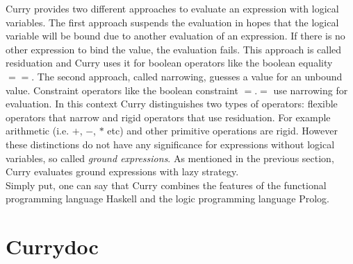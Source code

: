 \documentclass[%
	pdftex,%
	a4paper,%
	oneside,%
	chapterprefix,%
	headsepline,%
	12pt%
]{scrbook}
\begin{document}

Curry provides two different approaches to evaluate an expression with
logical variables. %
The first approach suspends the evaluation in hopes that the logical
variable will be bound due to another evaluation of an expression. %
If there is no other expression to bind the value, the evaluation
fails. %
This approach is called residuation and Curry uses it for boolean
operators like the boolean equality \ensuremath{==}. %
The second approach, called narrowing, guesses a value for an unbound
value. %
Constraint operators like the boolean constraint \ensuremath{\mathbin{=.=}} use narrowing
for evaluation. %
In this context Curry distinguishes two types of operators: flexible
operators that narrow and rigid operators that use residuation. %
For example arithmetic (i.e. \ensuremath{\mathbin{+}}, \ensuremath{\mathbin{-}}, \ensuremath{\mathbin{*}} etc) and other primitive
operations are rigid. %
However these distinctions do not have any significance for
expressions without logical variables, so called \emph{ground
  expressions}. %
As mentioned in the previous section, Curry evaluates ground
expressions with lazy strategy.\\

Simply put, one can say that Curry combines the features of the
functional programming language Haskell and the logic programming
language Prolog. %

\section{Currydoc}\label{preliminaries:currydoc}
\end{document}
